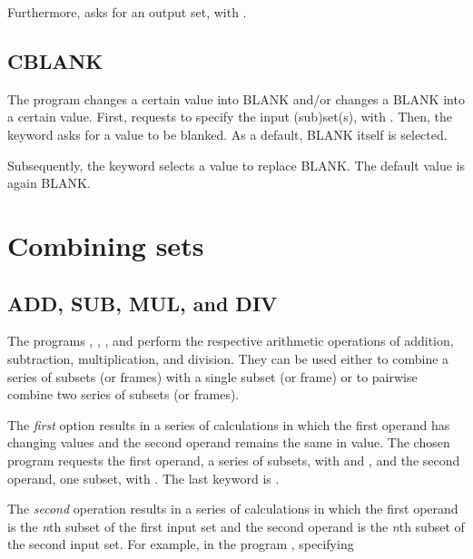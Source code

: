 Furthermore,  asks for an output set, with .


\subsection*{CBLANK}

The program  changes a certain value into BLANK and/or
changes a BLANK into a certain value.  First,  requests
to specify the input (sub)set(s), with .  Then, the
keyword  asks for a value to be blanked.  As a default,
BLANK itself is selected. 

Subsequently, the keyword  selects a value to replace
BLANK.  The default value is again BLANK.

\section{Combining sets}

\subsection*{ADD, SUB, MUL, and DIV}\label{sec-addetc}

The programs , , , and
 perform the respective arithmetic operations of addition,
subtraction, multiplication, and division.  They can be used either to
combine a series of subsets (or frames) with a single subset (or frame)
or to pairwise combine two series of subsets (or frames). 

The {\em first} option results in a series of calculations in which the
first operand has changing values and the second operand remains the
same in value.  The chosen program requests the first operand, a series
of subsets, with  and , and the second
operand, one subset, with .  The last keyword is
. 

The {\em second} operation results in a series of calculations in which
the first operand is the {\em n}th subset of the first input set and the
second operand is the {\em n}th subset of the second input set.  For
example, in the program , specifying



